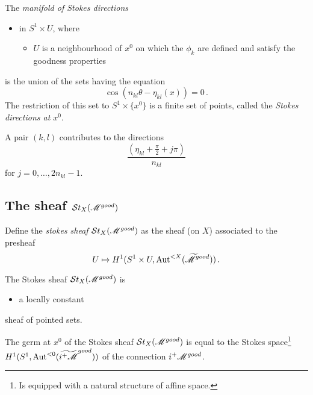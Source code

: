 \begin{defn}
  The \emph{manifold of Stokes directions}
  \begin{itemize}
    \item in $S^1\times U$, where
      \begin{itemize}
        \item $U$ is a neighbourhood of $x^0$ on which the $\phi_k$ are defined
          and satisfy the goodness properties
      \end{itemize}
  \end{itemize}
  is the union of the sets having the equation
  \[
    \cos(n_{kl}\theta-\eta_{kl}(x))=0 \,.
  \]
  The restriction of this set to $S^1\times\{x^0\}$ is a finite set of points,
  called the \emph{Stokes directions at $x^0$}.
  \begin{rem}
    A pair $(k,l)$ contributes to the directions
    \[
      \frac{\left(\eta_{kl}+\frac{\pi}{2}+j\pi\right)}{n_{kl}}
    \]
    for $j=0,\dots,2n_{kl}-1$.
  \end{rem}
\end{defn}
\begin{ex}
\end{ex}

\subsection{The sheaf $\mathcal{S}{}t_X(\mathscr{M}^{good})$}
\begin{defn}
  Define the \emph{stokes sheaf} $\mathcal{S}{}t_X(\mathscr{M}^{good})$ as the sheaf (on $X$)
  associated to the presheaf
  \[
    U\mapsto H^1(S^1\times U,\operatorname{Aut}^{<X}(\widetilde {\mathscr{M}}^{good}))\,.
  \]
\end{defn}
\begin{thm}
  The Stokes sheaf $\mathcal{S}{}t_X(\mathscr{M}^{good})$ is
  \begin{itemize}
    \item a locally constant
  \end{itemize}
  sheaf of pointed sets.
\end{thm}
\begin{prop}
  The germ at $x^0$ of the Stokes sheaf $\mathcal{S}{}t_X(\mathscr{M}^{good})$ is equal to the
  Stokes space\footnote{Is equipped with a natural structure of affine space.}
  $H^1(S^1,\operatorname{Aut}^{<0}(\widetilde{i^+\mathscr{M}}^{good}))$ of the connection
  $i^+\mathscr{M}^{good}$.
\end{prop}

